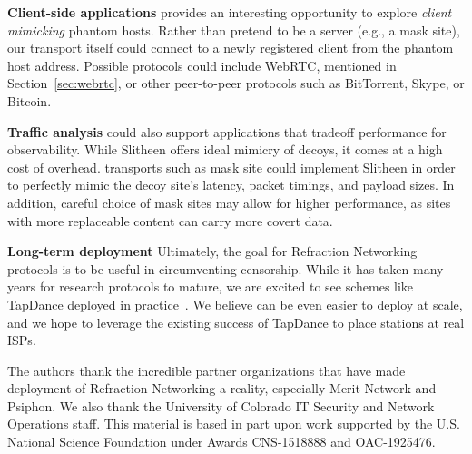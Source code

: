 \documentclass[sigconf]{acmart}
\renewcommand{\paragraph}[1]{\smallskip\noindent\textbf{#1\quad}}
\begin{document}
\paragraph{Client-side applications}
\scheme provides an interesting opportunity to explore
\emph{client mimicking} phantom hosts. Rather than pretend to be a server (e.g.,
a mask site), our transport itself could connect to a newly registered client
from the phantom host address. Possible protocols could include WebRTC, mentioned in
Section~\ref{sec:webrtc}, or other peer-to-peer protocols such as BitTorrent,
Skype, or Bitcoin.

\paragraph{Traffic analysis}
\scheme could also support applications that tradeoff performance for
observability. While Slitheen offers ideal mimicry of decoys, it comes at a high
cost of overhead. \scheme transports such as mask site could implement Slitheen
in order to perfectly mimic the decoy site's latency, packet timings, and payload
sizes. In addition, careful choice of mask sites may allow for higher
performance, as sites with more replaceable content can carry more covert data.

\paragraph{Long-term deployment}
Ultimately, the goal for Refraction Networking protocols is to be useful in
circumventing censorship. While it has taken many years for research
protocols to mature, we are excited to see schemes like TapDance deployed in
practice~\cite{frolov2017isp}. We believe \scheme can be even easier to deploy
at scale, and we hope to leverage the existing success of TapDance to place \scheme
stations at real ISPs.


%


\begin{acks}
  The authors thank the incredible partner organizations that have
  made deployment of Refraction Networking a reality, especially Merit
  Network and Psiphon. We also thank the
  University of Colorado IT Security and Network Operations
  staff. This material is based in part upon work supported by the
  U.S. National Science Foundation under Awards
  CNS-1518888 and OAC-1925476.
\end{acks}


\balance


%
\end{document}
